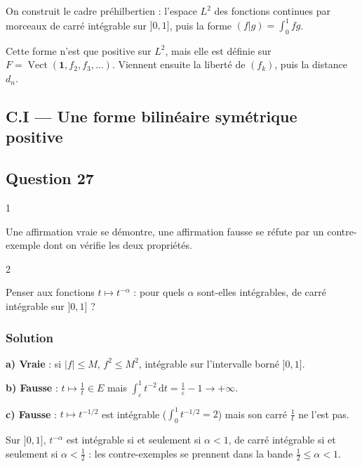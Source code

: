 \documentclass[11pt,a4paper]{article}
\begin{document}
On construit le cadre préhilbertien : l'espace \(L^2\) des fonctions continues par morceaux de carré intégrable sur \(]0,1]\), puis la forme \((f|g)=\int_0^1fg\).

Cette forme n'est que positive sur \(L^2\), mais elle est définie sur \(F=\operatorname{Vect}(\mathbf 1,f_2,f_3,\dots)\). Viennent ensuite la liberté de \((f_k)\), puis la distance \(d_n\).

\hypertarget{c.i-une-forme-bilinuxe9aire-symuxe9trique-positive}{%
\subsection{C.I --- Une forme bilinéaire symétrique positive}\label{c.i-une-forme-bilinuxe9aire-symuxe9trique-positive}}

\hypertarget{question-27}{%
\subsection{Question 27}\label{question-27}}

\begin{indication}{1}

Une affirmation vraie se démontre, une affirmation fausse se réfute par un contre-exemple dont on vérifie les deux propriétés.

\end{indication}

\begin{indication}{2}

Penser aux fonctions \(t\mapsto t^{-\alpha}\) : pour quels \(\alpha\) sont-elles intégrables, de carré intégrable sur \(]0,1]\) ?

\end{indication}

\hypertarget{solution-26}{%
\subsubsection{Solution}\label{solution-26}}

\textbf{a) Vraie} : si \(|f|\leqslant M\), \(f^2\leqslant M^2\), intégrable sur l'intervalle borné \(]0,1]\).

\textbf{b) Fausse} : \(t\mapsto\frac1t\in E\) mais \(\int_\varepsilon^1t^{-2}\,\mathrm dt=\frac1\varepsilon-1\to+\infty\).

\textbf{c) Fausse} : \(t\mapsto t^{-1/2}\) est intégrable (\(\int_0^1t^{-1/2}=2\)) mais son carré \(\frac1t\) ne l'est pas.

\begin{methode}

Sur \(]0,1]\), \(t^{-\alpha}\) est intégrable si et seulement si \(\alpha<1\), de carré intégrable si et seulement si \(\alpha<\frac12\) : les contre-exemples se prennent dans la bande \(\frac12\leqslant\alpha<1\).

\end{methode}
\end{document}
